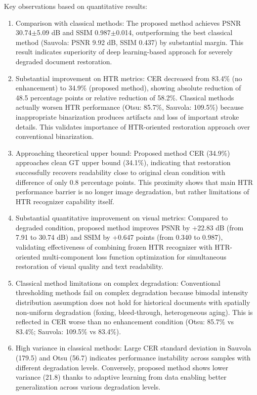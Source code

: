 \documentclass[journal]{IEEEtran}
\begin{document}
Key observations based on quantitative results:
\begin{enumerate}
    \item Comparison with classical methods: The proposed method achieves PSNR 30.74$\pm$5.09 dB and SSIM 0.987$\pm$0.014, outperforming the best classical method (Sauvola: PSNR 9.92 dB, SSIM 0.437) by substantial margin. This result indicates superiority of deep learning-based approach for severely degraded document restoration.
    
    \item Substantial improvement on HTR metrics: CER decreased from 83.4\% (no enhancement) to 34.9\% (proposed method), showing absolute reduction of 48.5 percentage points or relative reduction of 58.2\%. Classical methods actually worsen HTR performance (Otsu: 85.7\%, Sauvola: 109.5\%) because inappropriate binarization produces artifacts and loss of important stroke details. This validates importance of HTR-oriented restoration approach over conventional binarization.
    
    \item Approaching theoretical upper bound: Proposed method CER (34.9\%) approaches clean GT upper bound (34.1\%), indicating that restoration successfully recovers readability close to original clean condition with difference of only 0.8 percentage points. This proximity shows that main HTR performance barrier is no longer image degradation, but rather limitations of HTR recognizer capability itself.
    
    \item Substantial quantitative improvement on visual metrics: Compared to degraded condition, proposed method improves PSNR by +22.83 dB (from 7.91 to 30.74 dB) and SSIM by +0.647 points (from 0.340 to 0.987), validating effectiveness of combining frozen HTR recognizer with HTR-oriented multi-component loss function optimization for simultaneous restoration of visual quality and text readability.
    
    \item Classical method limitations on complex degradation: Conventional thresholding methods fail on complex degradation because bimodal intensity distribution assumption does not hold for historical documents with spatially non-uniform degradation (foxing, bleed-through, heterogeneous aging). This is reflected in CER worse than no enhancement condition (Otsu: 85.7\% vs 83.4\%; Sauvola: 109.5\% vs 83.4\%).
    
    \item High variance in classical methods: Large CER standard deviation in Sauvola (179.5) and Otsu (56.7) indicates performance instability across samples with different degradation levels. Conversely, proposed method shows lower variance (21.8) thanks to adaptive learning from data enabling better generalization across various degradation levels.
\end{enumerate}
\end{document}
